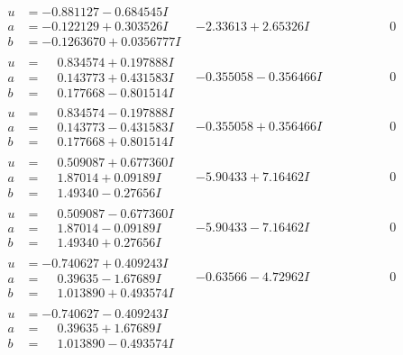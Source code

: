 \documentclass[1p]{elsarticle_modified}
\theoremstyle{definition}
\begin{document}
$$\begin{array}{c|c|c}
\begin{aligned}
u &= -0.881127 - 0.684545 I \\
a &= -0.122129 + 0.303526 I \\
b &= -0.1263670 + 0.0356777 I\end{aligned}
 & -2.33613 + 2.65326 I & \phantom{-0.000000 } 0 \\ \hline\begin{aligned}
u &= \phantom{-}0.834574 + 0.197888 I \\
a &= \phantom{-}0.143773 + 0.431583 I \\
b &= \phantom{-}0.177668 - 0.801514 I\end{aligned}
 & -0.355058 - 0.356466 I & \phantom{-0.000000 } 0 \\ \hline\begin{aligned}
u &= \phantom{-}0.834574 - 0.197888 I \\
a &= \phantom{-}0.143773 - 0.431583 I \\
b &= \phantom{-}0.177668 + 0.801514 I\end{aligned}
 & -0.355058 + 0.356466 I & \phantom{-0.000000 } 0 \\ \hline\begin{aligned}
u &= \phantom{-}0.509087 + 0.677360 I \\
a &= \phantom{-}1.87014 + 0.09189 I \\
b &= \phantom{-}1.49340 - 0.27656 I\end{aligned}
 & -5.90433 + 7.16462 I & \phantom{-0.000000 } 0 \\ \hline\begin{aligned}
u &= \phantom{-}0.509087 - 0.677360 I \\
a &= \phantom{-}1.87014 - 0.09189 I \\
b &= \phantom{-}1.49340 + 0.27656 I\end{aligned}
 & -5.90433 - 7.16462 I & \phantom{-0.000000 } 0 \\ \hline\begin{aligned}
u &= -0.740627 + 0.409243 I \\
a &= \phantom{-}0.39635 - 1.67689 I \\
b &= \phantom{-}1.013890 + 0.493574 I\end{aligned}
 & -0.63566 - 4.72962 I & \phantom{-0.000000 } 0 \\ \hline\begin{aligned}
u &= -0.740627 - 0.409243 I \\
a &= \phantom{-}0.39635 + 1.67689 I \\
b &= \phantom{-}1.013890 - 0.493574 I\end{aligned}

\end{array}$$
\end{document}

